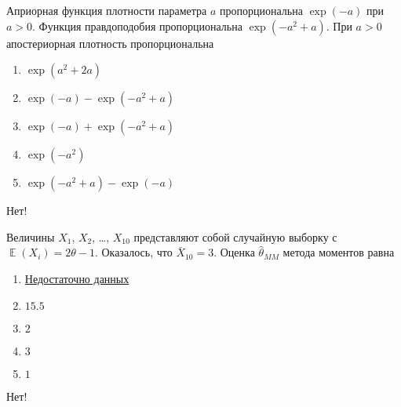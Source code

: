 \documentclass[t]{beamer}
\DeclareMathOperator{\E}{\mathbb{E}}
\begin{document}
 \begin{frame} \label{12-No} 
\begin{block}{12} 

  Априорная функция плотности параметра $a$  пропорциональна $\exp(-a)$ при $a>0$. Функция правдоподобия пропорциональна $\exp(-a^2+a)$. При $a>0$ апостериорная плотность пропорциональна


 \end{block} 
\begin{enumerate} 
\item[] \hyperlink{12-No}{\beamergotobutton{} $\exp(a^2+2a)$}
\item[] \hyperlink{12-No}{\beamergotobutton{} $\exp(-a) - \exp(-a^2+a)$}
\item[] \hyperlink{12-No}{\beamergotobutton{} $\exp(-a) + \exp(-a^2+a)$}
\item[] \hyperlink{12-Yes}{\beamergotobutton{} $\exp(-a^2)$}
\item[] \hyperlink{12-No}{\beamergotobutton{} $\exp(-a^2+a) - \exp(-a)$}
\end{enumerate} 

 \alert{Нет!} 
\end{frame} 


 \begin{frame} \label{13-No} 
\begin{block}{13} 

  Величины $X_1$, $X_2$, \ldots, $X_{10}$ представляют собой случайную выборку с $\E(X_i) = 2\theta - 1$. Оказалось, что $\bar X_{10}=3$. Оценка $\hat\theta_{MM}$ метода моментов равна


 \end{block} 
\begin{enumerate} 
\item[] \hyperlink{13-No}{\beamergotobutton{} Недостаточно данных}
\item[] \hyperlink{13-No}{\beamergotobutton{} $15.5$}
\item[] \hyperlink{13-Yes}{\beamergotobutton{} $2$}
\item[] \hyperlink{13-No}{\beamergotobutton{} $3$}
\item[] \hyperlink{13-No}{\beamergotobutton{} $1$}
\end{enumerate} 

 \alert{Нет!} 
\end{frame} 
\end{document}
